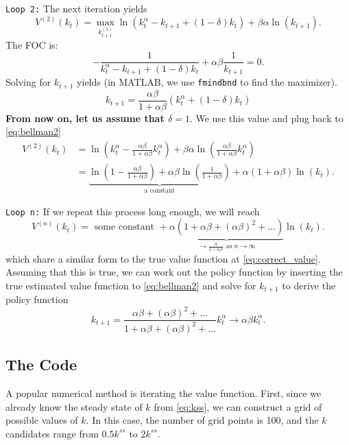 \documentclass[10pt,a4paper]{article}
\begin{document}
\verb|Loop 2:| The next iteration yields
\begin{equation*}
	V^{(2)} (k_t) = \max_{k^{(1)}_{t+1}} \ln (k_t^\alpha - k_{t+1} + (1-\delta)k_t) + \beta \alpha \ln(k_{t+1}).
\end{equation*}
The FOC is:
\begin{equation*}
	-\frac{1}{k_t^\alpha - k_{t+1} + (1-\delta)k_t} + \alpha \beta \frac{1}{k_{t+1}} = 0.
\end{equation*}
Solving for $k_{t+1}$ yields (in MATLAB, we use \verb|fmindbnd| to find the maximizer).
\begin{equation*}
	k_{t+1} = \frac{\alpha\beta}{1+\alpha\beta} \left( k_t^\alpha + (1-\delta)k_t\right)
\end{equation*}
\textbf{From now on, let us assume that $\delta=1$}. We use this value and plug back to \eqref{eq:bellman2}
\begin{align*}
	V^{(2)} (k_t) &= \ln \left(k_t^\alpha - \frac{\alpha\beta}{1+\alpha\beta}k_t^\alpha \right) + \beta\alpha \ln\left( \frac{\alpha\beta}{1+\alpha\beta} k_t^\alpha \right) \\
	&= \underbrace{\ln\left(1-\frac{\alpha\beta}{1+\alpha\beta}\right) + \alpha\beta\ln\left(\frac{1}{1+\alpha\beta}\right)}_{\text{a constant}} + \alpha (1+\alpha\beta)\ln(k_t).
\end{align*}

\verb|Loop n:| If we repeat this process long enough, we will reach 
\begin{equation*}
	V^{(n)}(k_{t}) = \text{ some constant } + \underbrace{\alpha (1+\alpha\beta + (\alpha\beta)^2 + \dots )}_{\to \frac{\alpha}{1-\alpha\beta} \text{ as } n \to \infty} \ln(k_t).
\end{equation*}
which share a similar form to the true value function at \eqref{eq:correct_value}. Assuming that this is true, we can work out the policy function by inserting the true estimated value function to \eqref{eq:bellman2} and solve for $k_{t+1}$ to derive the policy function
\begin{equation*}
	k_{t+1} = \frac{\alpha\beta + (\alpha\beta)^2 + \dots}{1 + \alpha\beta + (\alpha\beta)^2 + \dots} k^\alpha_t \to \alpha\beta k_t^\alpha.
\end{equation*}


\subsection{The Code}
A popular numerical method is iterating the value function. First, since we already know the steady state of $k$ from \eqref{eq:kss}, we can construct a grid of possible values of $k$. In this case, the number of grid points is 100, and the $k$ candidates range from $0.5 k^{ss}$ to $2 k^{ss}$.
\end{document}
